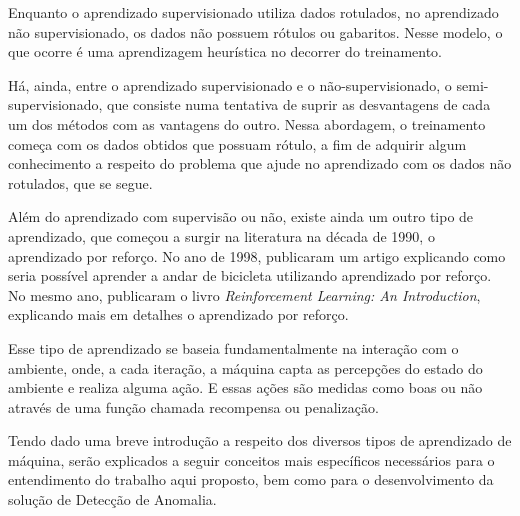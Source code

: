 Enquanto o aprendizado supervisionado utiliza dados rotulados, no aprendizado não supervisionado, os dados não possuem rótulos ou gabaritos. Nesse modelo, o que ocorre é uma aprendizagem heurística no decorrer do treinamento.


Há, ainda, entre o aprendizado supervisionado e o não-supervisionado, o semi-supervisionado, que consiste numa tentativa de suprir as desvantagens de cada um dos métodos com as vantagens do outro. Nessa abordagem, o treinamento começa com os dados obtidos que possuam rótulo, a fim de adquirir algum conhecimento a respeito do problema que ajude no aprendizado com os dados não rotulados, que se segue.\cite{tcc_anomalia_2020}

Além do aprendizado com supervisão ou não, existe ainda um outro tipo de aprendizado, que começou a surgir na literatura na década de 1990, o aprendizado por reforço. No ano de 1998, \citeauthor{drive_a_bicycle_rl_jette} publicaram um artigo explicando como seria possível aprender a andar de bicicleta utilizando aprendizado por reforço. No mesmo ano, \citeauthor{rl_an_introduction} publicaram o livro \textit{Reinforcement Learning: An Introduction}, explicando mais em detalhes o aprendizado por reforço. \cite{rl_an_introduction}

Esse tipo de aprendizado se baseia fundamentalmente na interação com o ambiente, onde, a cada iteração, a máquina capta as percepções do estado do ambiente e realiza alguma ação. E essas ações são medidas como boas ou não através de uma função chamada recompensa ou penalização.

Tendo dado uma breve introdução a respeito dos diversos tipos de aprendizado de máquina, serão explicados a seguir conceitos mais específicos necessários para o entendimento do trabalho aqui proposto, bem como para o desenvolvimento da solução de Detecção de Anomalia.





